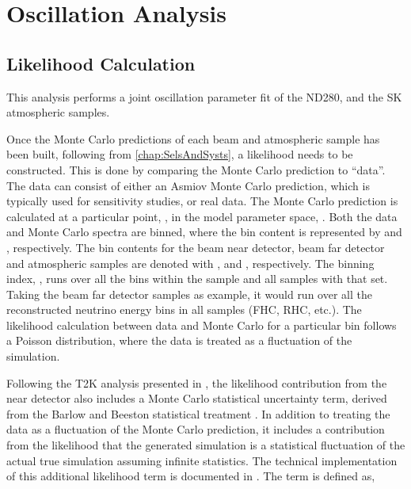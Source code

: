 \chapter{Oscillation Analysis}
\label{chap:OscillationAnalysis}

\section{Likelihood Calculation}
\label{sec:OscillationAnalysis_LLHCalc}

This analysis performs a joint oscillation parameter fit of the ND280,  and the SK atmospheric samples.

Once the Monte Carlo predictions of each beam and atmospheric sample has been built, following from \autoref{chap:SelsAndSysts}, a likelihood needs to be constructed. This is done by comparing the Monte Carlo prediction to ``data''. The data can consist of either an Asmiov Monte Carlo prediction, which is typically used for sensitivity studies, or real data. The Monte Carlo prediction is calculated at a particular point, \quickmath{\vec{\theta}}, in the model parameter space, . Both the data and Monte Carlo spectra are binned, where the  bin content is represented by  and , respectively. The bin contents for the beam near detector, beam far detector and atmospheric samples are denoted with ,  and , respectively. The binning index, , runs over all the bins within the sample and all samples with that set. Taking the beam far detector samples as example, it would run over all the reconstructed neutrino energy bins in all samples (FHC, RHC, etc.). The likelihood calculation between data and Monte Carlo for a particular bin follows a Poisson distribution, where the data is treated as a fluctuation of the simulation. 

Following the T2K analysis presented in \cite{Dunne2020-uf}, the likelihood contribution from the near detector also includes a Monte Carlo statistical uncertainty term, derived from the Barlow and Beeston statistical treatment \cite{Barlow1993-cc, Conway2011-go}. In addition to treating the data as a fluctuation of the Monte Carlo prediction, it includes a contribution from the likelihood that the generated simulation is a statistical fluctuation of the actual true simulation assuming infinite statistics. The technical implementation of this additional likelihood term is documented in \cite{t2k_tn_395}. The term is defined as,

